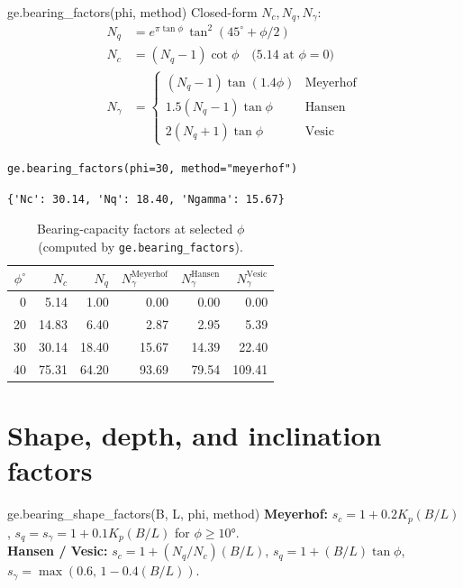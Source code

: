 \documentclass[11pt,a4paper,openany]{book}
\begin{document}
\begin{funcbox}{ge.bearing\_factors(phi, method)}
Closed-form $N_c, N_q, N_\gamma$:
\begin{align}
N_q &= e^{\pi\tan\phi}\,\tan^2(45^\circ + \phi/2) \\
N_c &= (N_q - 1)\cot\phi \quad\text{(}5.14\text{ at }\phi = 0\text{)}\\
N_\gamma &= \begin{cases}
(N_q - 1)\tan(1.4\phi) & \text{Meyerhof}\\
1.5(N_q - 1)\tan\phi   & \text{Hansen}\\
2(N_q + 1)\tan\phi     & \text{Vesic}
\end{cases}
\end{align}
\end{funcbox}

\begin{lstlisting}
ge.bearing_factors(phi=30, method="meyerhof")
\end{lstlisting}
\begin{lstlisting}[style=output]
{'Nc': 30.14, 'Nq': 18.40, 'Ngamma': 15.67}
\end{lstlisting}

\begin{table}[h]\centering
\caption{Bearing-capacity factors at selected $\phi$ (computed by
\texttt{ge.bearing\_factors}).}
\label{tab:Nfactors}
\small
\begin{tabular}{rrrrrr}\toprule
$\phi^\circ$ & $N_c$ & $N_q$ & $N_\gamma^{\text{Meyerhof}}$ &
$N_\gamma^{\text{Hansen}}$ & $N_\gamma^{\text{Vesic}}$\\\midrule
0  & 5.14  & 1.00  & 0.00  & 0.00  & 0.00\\
20 & 14.83 & 6.40  & 2.87  & 2.95  & 5.39\\
30 & 30.14 & 18.40 & 15.67 & 14.39 & 22.40\\
40 & 75.31 & 64.20 & 93.69 & 79.54 & 109.41\\
\bottomrule
\end{tabular}
\end{table}

\section{Shape, depth, and inclination factors}

\begin{funcbox}{ge.bearing\_shape\_factors(B, L, phi, method)}
\textbf{Meyerhof:} $s_c = 1 + 0.2 K_p (B/L)$, $s_q = s_\gamma =
1 + 0.1 K_p (B/L)$ for $\phi \geq 10°$.\\
\textbf{Hansen / Vesic:} $s_c = 1 + (N_q/N_c)(B/L)$,
$s_q = 1 + (B/L)\tan\phi$,
$s_\gamma = \max(0.6,\, 1 - 0.4(B/L))$.
\end{funcbox}
\end{document}
